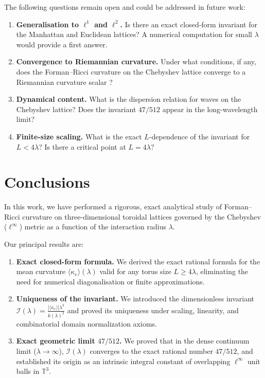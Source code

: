 \documentclass[aps,pre,onecolumn,10pt,groupedaddress,amsmath,amssymb,floatfix]{revtex4-2}
\begin{document}
The following questions remain open and could be addressed in future work:
\begin{enumerate}
\item \textbf{Generalisation to $\ell^1$ and $\ell^2$.} Is there an exact closed-form invariant for the Manhattan and Euclidean lattices? A numerical computation for small $\lambda$ would provide a first answer.
\item \textbf{Convergence to Riemannian curvature.} Under what conditions, if any, does the Forman--Ricci curvature on the Chebyshev lattice converge to a Riemannian curvature scalar \cite{docarmo1992riemannian}?
\item \textbf{Dynamical content.} What is the dispersion relation for waves on the Chebyshev lattice? Does the invariant $47/512$ appear in the long-wavelength limit?
\item \textbf{Finite-size scaling.} What is the exact $L$-dependence of the invariant for $L < 4\lambda$? Is there a critical point at $L = 4\lambda$?
\end{enumerate}

\section{Conclusions}
\label{sec:conclusions}

In this work, we have performed a rigorous, exact analytical study of Forman--Ricci curvature on three-dimensional toroidal lattices governed by the Chebyshev ($\ell^\infty$) metric as a function of the interaction radius $\lambda$.

Our principal results are:
\begin{enumerate}
\item \textbf{Exact closed-form formula.} We derived the exact rational formula for the mean curvature $\langle \kappa_e \rangle(\lambda)$ valid for any torus size $L \ge 4\lambda$, eliminating the need for numerical diagonalisation or finite approximations.

\item \textbf{Uniqueness of the invariant.} We introduced the dimensionless invariant $\mathcal{I}(\lambda) = \frac{|\langle \kappa_e \rangle| \lambda^3}{k(\lambda)^2}$ and proved its uniqueness under scaling, linearity, and combinatorial domain normalization axioms.

\item \textbf{Exact geometric limit $47/512$.} We proved that in the dense continuum limit ($\lambda \to \infty$), $\mathcal{I}(\lambda)$ converges to the exact rational number $47/512$, and established its origin as an intrinsic integral constant of overlapping $\ell^\infty$ unit balls in $\mathbb{T}^3$.
\end{enumerate}
\end{document}

